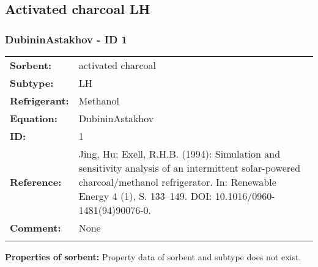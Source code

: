 \subsection{Activated charcoal LH}
%
\subsubsection{DubininAstakhov - ID 1}
%
\begin{tabular}[l]{|lp{11.5cm}|}
\hline
\addlinespace

\textbf{Sorbent:} & activated charcoal \\
\textbf{Subtype:} & LH \\
\textbf{Refrigerant:} & Methanol \\
\textbf{Equation:} & DubininAstakhov \\
\textbf{ID:} & 1 \\
\textbf{Reference:} & Jing, Hu; Exell, R.H.B. (1994): Simulation and sensitivity analysis of an intermittent solar-powered charcoal/methanol refrigerator. In: Renewable Energy 4 (1), S. 133–149. DOI: 10.1016/0960-1481(94)90076-0. \\
\textbf{Comment:} & None \\

\addlinespace
\hline
\end{tabular}
\newline

\textbf{Properties of sorbent:}
\newline
%
Property data of sorbent and subtype does not exist.

